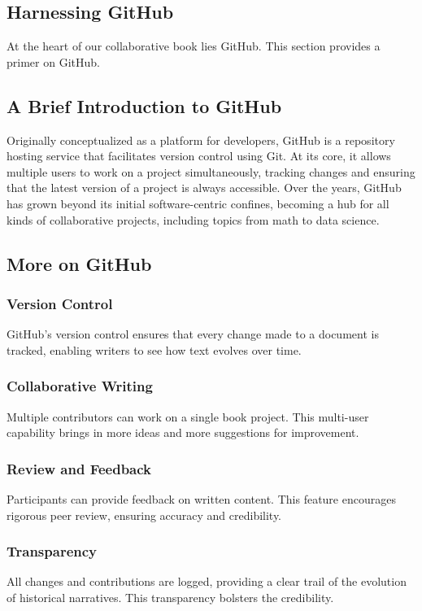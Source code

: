 \documentclass{book}
\begin{document}
\subsection*{Harnessing GitHub}
At the heart of our collaborative book lies GitHub. This section provides a primer on GitHub.

\subsection*{A Brief Introduction to GitHub}
Originally conceptualized as a platform for developers, GitHub is a repository hosting service that facilitates version control using Git. At its core, it allows multiple users to work on a project simultaneously, tracking changes and ensuring that the latest version of a project is always accessible. Over the years, GitHub has grown beyond its initial software-centric confines, becoming a hub for all kinds of collaborative projects, including topics from math to data science.

\subsection*{More on GitHub}
\subsubsection*{Version Control}
GitHub's version control ensures that every change made to a document is tracked, enabling writers to see how text evolves over time.

\subsubsection*{Collaborative Writing}
Multiple contributors can work on a single book project. This multi-user capability brings in more ideas and more suggestions for improvement.

\subsubsection*{Review and Feedback}
Participants can provide feedback on written content. This feature encourages rigorous peer review, ensuring accuracy and credibility.

\subsubsection*{Transparency}
All changes and contributions are logged, providing a clear trail of the evolution of historical narratives. This transparency bolsters the credibility.
\end{document}
